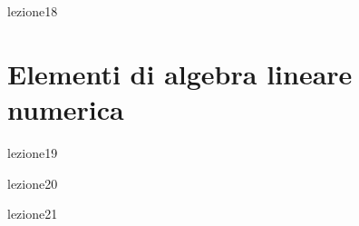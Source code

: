 \documentclass[12pt,a4paper,headings=optiontohead]{scrbook}
\begin{document}
\newpage
{lezione18}


\newpage

\chapter{Elementi di algebra lineare numerica}
{lezione19}


\newpage
{lezione20}


\newpage
{lezione21}
\end{document}
